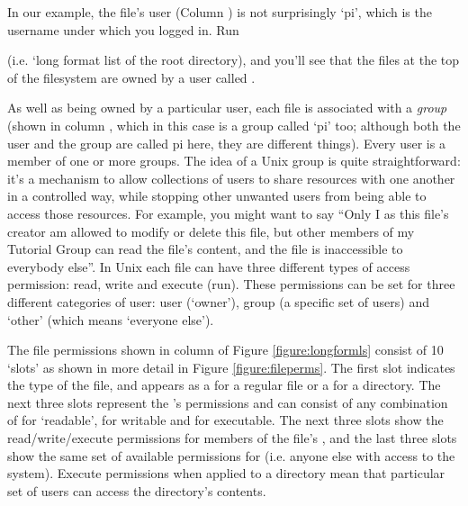 In our example, the file's user (Column \protect{}) is not surprisingly `pi', which is the username under which you logged in. Run 


(i.e. `long format list of the root directory), and you'll see that the files at the top of the filesystem are owned by a user called . 

As well as being owned by a particular user, each file is associated with a \textit{group} (shown in column \protect{}, which in this case is a group called `pi' too; although both the user and the group are called pi here, they are different things). Every user is a member of one or more groups. The idea of a Unix group is quite straightforward: it's a mechanism to allow collections of users to share resources with one another in a controlled way, while stopping other unwanted users from being able to access those resources. For example, you might want to say ``Only I as this file's creator am allowed to modify or delete this file, but other members of my Tutorial Group can read the file's content, and the file is inaccessible to everybody else''. In Unix each file can have three different types of access permission: read, write and execute (run). These permissions can be set for three different categories of user: user (`owner'), group (a specific set of users) and `other' (which means `everyone else').

The file permissions shown in column \protect{} of Figure \ref{figure:longformls} consist of 10 `slots' as shown in more detail in Figure \ref{figure:fileperms}. The first slot indicates the type of the file, and appears as a \ttout{-} for a regular file or a  for a directory. The next three slots represent the 's  permissions and can consist of any combination of  for `readable',  for writable and  for executable. The next three slots show the read/write/execute permissions for members of the file's , and the last three slots show the same set of available permissions for  (i.e. anyone else with access to the system). Execute permissions when applied to a directory mean that particular set of users can access the directory's contents.

